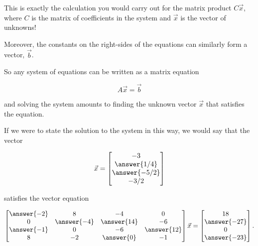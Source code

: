 \documentclass{ximera}
\begin{document}
\begin{example}
\begin{remark}
This is exactly the calculation you would carry out for the matrix product $C\vec{x}$, where $C$ is the matrix of coefficients in the system and $\vec{x}$ is the vector of unknowns!

Moreover, the constants on the right-sides of the equations can similarly form a vector, $\vec{b}$. 

So any system of equations can be written as a matrix equation

$$A\vec{x} = \vec{b}$$

and solving the system amounts to finding the unknown vector $\vec{x}$ that satisfies the equation.

If we were to state the solution to the system in this way, we would say that the vector

$$\vec{x} = \begin{bmatrix}-3 \\ \answer{1/4}\\\answer{-5/2}\\-3/2\end{bmatrix}$$

satisfies the vector equation 

$$\begin{bmatrix}
  \answer{-2} & 8 & -4 & 0 \\ 
  0 & \answer{-4} & \answer{14} & -6 \\ 
  \answer{-1} & 0 & -6 & \answer{12} \\ 
  8 & -2 & \answer{0} & -1\end{bmatrix}\vec{x} = \begin{bmatrix}18 \\ \answer{-27}\\0\\\answer{-23}\end{bmatrix}.$$


\end{remark}

\end{example}
\end{document}
